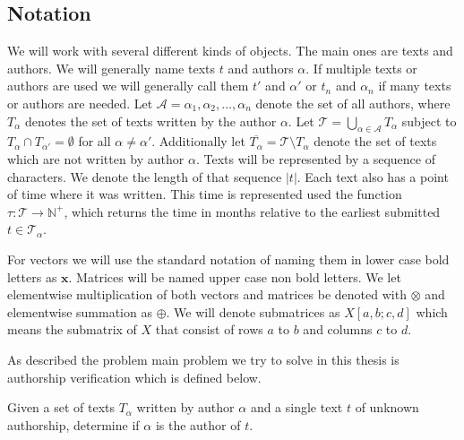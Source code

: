 \subsection{Notation} \label{subsec:notation}

We will work with several different kinds of objects. The main ones are texts
and authors. We will generally name texts $t$ and authors $\alpha$. If multiple
texts or authors are used we will generally call them $t'$ and $\alpha'$ or
$t_n$ and $\alpha_n$ if many texts or authors are needed. Let $\mathcal{A} =
{\alpha_1, \alpha_2, \dots, \alpha_n}$ denote the set of all authors, where
$T_\alpha$ denotes the set of texts written by the author $\alpha$. Let
$\mathcal{T} = \bigcup_{\alpha \in \mathcal{A}} T_\alpha$ subject to $T_{\alpha}
\cap T_{\alpha'} = \emptyset$ for all $\alpha \neq \alpha'$. Additionally
let $\overline{T_\alpha} = \mathcal{T} \setminus T_\alpha$ denote the set of
texts which are not written by author $\alpha$. Texts will be represented by a
sequence of characters. We denote the length of that sequence $|t|$. Each text
also has a point of time where it was written. This time is represented used the
function $\tau \colon \mathcal{T} \rightarrow \mathbb{N}^+$, which returns the
time in months relative to the earliest submitted $t \in \mathcal{T_\alpha}$.

For vectors we will use the standard notation of naming them in lower case bold
letters as $\mathbf{x}$. Matrices will be named upper case non bold letters.
We let elementwise multiplication of both vectors and matrices be denoted with
$\otimes$ and elementwise summation as $\oplus$. We will denote submatrices as
$X[a,b;c,d]$ which means the submatrix of $X$ that consist of rows $a$ to $b$
and columns $c$ to $d$.


As described the problem main problem we try to solve in this thesis is
authorship verification which is defined below.

\begin{definition}
    \label{def:authorship_verification}

    Given a set of texts $T_\alpha$ written by author $\alpha$ and a single text
    $t$ of unknown authorship, determine if $\alpha$ is the author of $t$.

\end{definition}

